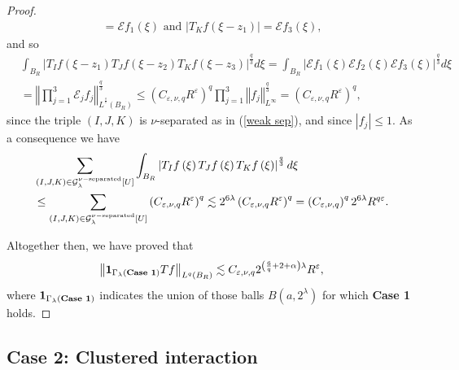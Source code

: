 \documentclass{amsart}%
\theoremstyle{plain}
\numberwithin{equation}{section}
\begin{document}
\begin{proof}
\begin{align*}
=\mathcal{E}f_{1}\left(  \xi\right)  \text{ and }\left\vert T_{K}f\left(
\xi-z_{1}\right)  \right\vert =\mathcal{E}f_{3}\left(  \xi\right)  \text{,}%
\end{align*}
and so%
\begin{align*}
&  \int_{B_{R}}\left\vert T_{I}f\left(  \xi-z_{1}\right)  T_{J}f\left(
\xi-z_{2}\right)  T_{K}f\left(  \xi-z_{3}\right)  \right\vert ^{\frac{q}{3}%
}d\xi=\int_{B_{R}}\left\vert \mathcal{E}f_{1}\left(  \xi\right)
\mathcal{E}f_{2}\left(  \xi\right)  \mathcal{E}f_{3}\left(  \xi\right)
\right\vert ^{\frac{q}{3}}d\xi\\
&  =\left\Vert \prod_{j=1}^{3}\mathcal{E}_{j}f_{j}\right\Vert _{L^{^{\frac
{q}{3}}}\left(  B_{R}\right)  }^{\frac{q}{3}}\leq\left(  C_{\varepsilon,\nu
,q}R^{\varepsilon}\right)  ^{q}\prod_{j=1}^{3}\left\Vert f_{j}\right\Vert
_{L^{\infty}}^{\frac{q}{3}}=\left(  C_{\varepsilon,\nu,q}R^{\varepsilon
}\right)  ^{q},
\end{align*}
since the triple $\left(  I,J,K\right)  $ is $\nu$-separated as in
(\ref{weak sep}), and since $\left\vert f_{j}\right\vert \leq1$. As a
consequence we have%
\begin{align*}
&  \sum_{\left(  I,J,K\right)  \in\mathcal{G}_{\lambda}^{\nu
-\mathop{\rm separated}}\left[  U\right]  }\int_{B_{R}}\left\vert
T_{I}f\left(  \xi\right)  T_{J}f\left(  \xi\right)  T_{K}f\left(  \xi\right)
\right\vert ^{\frac{q}{3}}d\xi\\
&  \leq\sum_{\left(  I,J,K\right)  \in\mathcal{G}_{\lambda}^{\nu
-\mathop{\rm separated}}\left[  U\right]  }\left(  C_{\varepsilon,\nu
,q}R^{\varepsilon}\right)  ^{q}\lesssim2^{6\lambda}\left(  C_{\varepsilon
,\nu,q}R^{\varepsilon}\right)  ^{q}=\left(  C_{\varepsilon,\nu,q}\right)
^{q}2^{6\lambda}R^{q\varepsilon}.
\end{align*}


Altogether then, we have proved that
\[
\left\Vert \mathbf{1}_{\Gamma_{\lambda}\left(  \text{\textbf{Case 1}}\right)
}Tf\right\Vert _{L^{q}\left(  B_{R}\right)  }\lesssim C_{\varepsilon,\nu
,q}2^{\left(  \frac{6}{q}+2+\alpha\right)  \lambda}R^{\varepsilon},
\]
where $\mathbf{1}_{\Gamma_{\lambda}\left(  \text{\textbf{Case 1}}\right)  }$
indicates the union of those balls $B\left(  a,2^{\lambda}\right)  $ for which
\textbf{Case 1} holds.
\end{proof}

\subsection{Case 2: Clustered interaction\label{Sub Case 2}}
\end{document}
